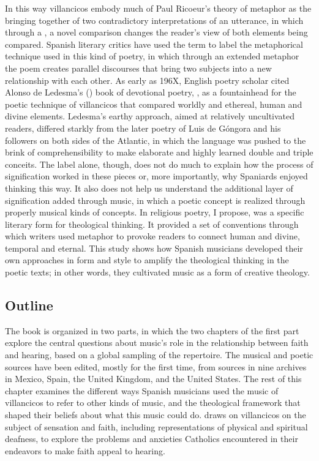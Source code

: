 In this way villancicos embody much of Paul Ricoeur's theory of metaphor as the
bringing together of two contradictory interpretations of an utterance, in
which through a , a novel comparison changes the
reader's view of both elements being compared.%
    \citXXX[ricoeur]
Spanish literary critics have used the term  to label the
metaphorical technique used in this kind of poetry, in which through an
extended metaphor the poem creates parallel discourses that bring two subjects
into a new relationship with each other.
As early as 196X\XXX[name], English poetry scholar \XXX[name] cited Alonso de
Ledesma's (\XXX[year]) book of devotional poetry, , as a fountainhead for the poetic technique of villancicos that
compared worldly and ethereal, human and divine elements.%
Ledesma's earthy approach, aimed at relatively uncultivated readers, differed
starkly from the later  poetry of Luis de Góngora and his
followers on both sides of the Atlantic, in which the language was pushed to
the brink of comprehensibility to make elaborate and highly learned double and
triple conceits.%
    \Autocites{Tenorio:Gongorismo}
    [227--228]{Gaylord:Poetry}
    {Gracian:Ingenio}
The label  alone, though, does not do much to explain how the
process of signification worked in these pieces or, more importantly, why
Spaniards enjoyed thinking this way.
It also does not help us understand the additional layer of signification added
through music, in which a poetic concept is realized through properly musical
kinds of concepts.
In religious poetry, I propose,  was a specific literary form
for theological thinking.
It provided a set of conventions through which writers used metaphor to provoke
readers to connect human and divine, temporal and eternal.
This study shows how Spanish musicians developed their own approaches in form
and style to amplify the theological thinking in the poetic texts; in other
words, they cultivated music as a form of creative theology.

\subsection{Outline}

The book is organized in two parts, in which the two chapters of the first part
explore the central questions about music's role in the relationship between
faith and hearing, based on a global sampling of the repertoire.
The musical and poetic sources have been edited, mostly for the first time,
from sources in nine archives in Mexico, Spain, the United Kingdom, and the
United States.
The rest of this chapter examines the different ways Spanish musicians used
the music of villancicos to refer to other kinds of music, and the theological
framework that shaped their beliefs about what this music could do.
 draws on villancicos on the subject of sensation and
faith, including representations of physical and spiritual deafness, to explore
the problems and anxieties Catholics encountered in their endeavors to make
faith appeal to hearing.

